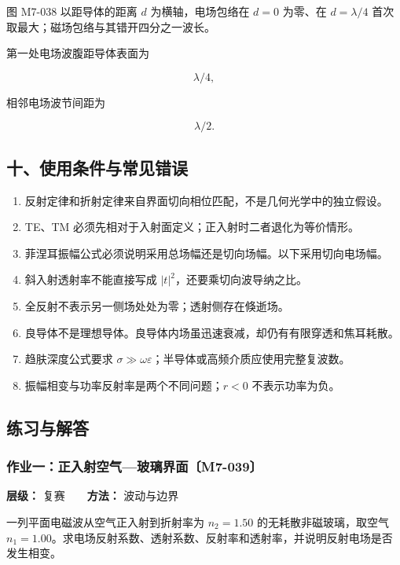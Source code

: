 图 M7-038 以距导体的距离 \(d\) 为横轴，电场包络在 \(d=0\) 为零、在
\(d=\lambda/4\) 首次取最大；磁场包络与其错开四分之一波长。

第一处电场波腹距导体表面为

\[
\boxed{\lambda/4},
\]

相邻电场波节间距为

\[
\boxed{\lambda/2}.
\]

\subsection{十、使用条件与常见错误}\label{m7:ux5341ux4f7fux7528ux6761ux4ef6ux4e0eux5e38ux89c1ux9519ux8bef}

\begin{enumerate}
\def\labelenumi{\arabic{enumi}.}
\tightlist
\item
  反射定律和折射定律来自界面切向相位匹配，不是几何光学中的独立假设。
\item
  TE、TM 必须先相对于入射面定义；正入射时二者退化为等价情形。
\item
  菲涅耳振幅公式必须说明采用总场幅还是切向场幅。以下采用切向电场幅。
\item
  斜入射透射率不能直接写成 \(|t|^2\)，还要乘切向波导纳之比。
\item
  全反射不表示另一侧场处处为零；透射侧存在倏逝场。
\item
  良导体不是理想导体。良导体内场虽迅速衰减，却仍有有限穿透和焦耳耗散。
\item
  趋肤深度公式要求
  \(\sigma\gg\omega\varepsilon\)；半导体或高频介质应使用完整复波数。
\item
  振幅相变与功率反射率是两个不同问题；\(r<0\) 不表示功率为负。
\end{enumerate}

\subsection{练习与解答}\label{m7:ux7ec3ux4e60ux4e0eux89e3ux7b54}

\par{}
\noindent\begin{minipage}{\linewidth}

\subsubsection{作业一：正入射空气---玻璃界面〔M7-039〕}\label{m7:ux4f5cux4e1aux4e00ux6b63ux5165ux5c04ux7a7aux6c14ux73bbux7483ux754cux9762m7-039}

\textbf{层级：} 复赛　　\textbf{方法：} 波动与边界

一列平面电磁波从空气正入射到折射率为 \(n_2=1.50\)
的无耗散非磁玻璃，取空气
\(n_1=1.00\)。求电场反射系数、透射系数、反射率和透射率，并说明反射电场是否发生相变。

\end{minipage}\par

